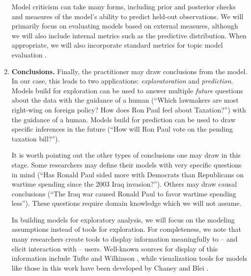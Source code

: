 \begin{enumerate}
    Model criticism can take many forms, including prior and posterior
    checks \cite{box:1980,gelman:1996} and measures of the model's
    ability to predict held-out observations. We will primarily focus
    on evaluating models based on external measures, although we will
    also include internal metrics such as the predictive
    distribution. When appropriate, we will also incorporate standard
    metrics for topic model evaluation \cite{wallach:2009}.
  
  \item \textbf{Conclusions.} Finally, the practitioner may draw
    conclusions from the model.  In our case, this leads to two
    applications: \emph{exploratoration} and \emph{prediction}.
    Models build for exploration can be used to answer multiple
    \emph{future} questions about the data with the guidance of a
    human (``Which lawmakers are most right-wing on foreign policy?
    How does Ron Paul feel about Taxation?'') with the guidance of a
    human.  Models build for prediction can be used to draw specific
    inferences in the future (``How will Ron Paul vote on the pending
    taxation bill?'').

    It is worth pointing out the other types of conclusions one may
    draw in this stage. Some researchers may define their models with
    very specific questions in mind (``Has Ronald Paul sided more with
    Democrats than Republicans on wartime spending since the 2003 Iraq
    invasion?'').  Others may draw causal conclusions (``The Iraq war
    caused Ronald Paul to favor wartime spending less''). These
    questions require domain knowledge which we will not assume.

    In building models for exploratory analysis, we will focus on the
    modeling assumptions instead of tools for exploration.  For
    completeness, we note that many researchers create tools to
    display information meaningfully to -- and elicit interaction with
    -- users.  Well-known sources for display of this information
    include Tufte \cite{tufte:2001} and Wilkinson
    \cite{wilkinson:2005}, while visualization tools for models like
    those in this work have been developed by Chaney and Blei
    \cite{chaney:2012}.

\end{enumerate}

